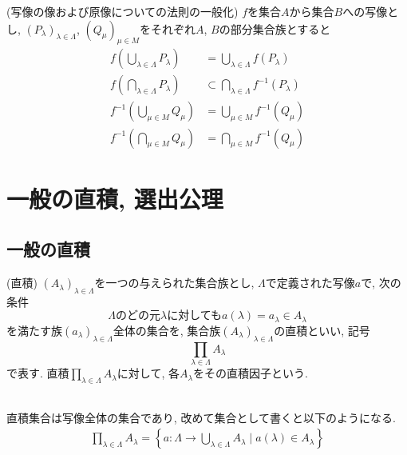 \documentclass[a4j]{jsarticle}
\begin{document}
\begin{itembox}[l]{ (写像の像および原像についての法則の一般化)}
  $f$を集合$A$から集合$B$への写像とし, $(P_\lambda)_{\lambda \in \Lambda}$, $(Q_\mu)_{\mu \in M}$をそれぞれ$A$, $B$の部分集合族とすると
  \begin{align}
    f \left( \bigcup_{\lambda \in \Lambda}P_\lambda \right) & = \bigcup_{\lambda \in \Lambda}f(P_\lambda)            \\
    f \left( \bigcap_{\lambda \in \Lambda}P_\lambda \right) & \subset \bigcap_{\lambda \in \Lambda}f^{-1}(P_\lambda) \\
    f^{-1} \left( \bigcup_{\mu \in M}Q_\mu \right)          & = \bigcup_{\mu \in M}f^{-1}(Q_\mu)                     \\
    f^{-1} \left( \bigcap_{\mu \in M}Q_\mu \right)          & = \bigcap_{\mu \in M}f^{-1}(Q_\mu)
  \end{align}
\end{itembox}

\section{一般の直積, 選出公理}

\subsection{一般の直積}

\begin{itembox}[l]{ (直積)}
  $(A_\lambda)_{\lambda \in \Lambda}$を一つの与えられた集合族とし, $\Lambda$で定義された写像$a$で, 次の条件$$ \Lambda\mbox{のどの元}\lambda\mbox{に対しても}a(\lambda)=a_\lambda \in A_\lambda $$を満たす族$(a_\lambda)_{\lambda \in \Lambda}$全体の集合を, 集合族$(A_\lambda)_{\lambda \in \Lambda}$の直積といい, 記号$$\prod_{\lambda \in \Lambda}A_\lambda$$で表す. 直積$\prod_{\lambda \in \Lambda}A_\lambda$に対して, 各$A_\lambda$をその直積因子という.
\end{itembox}\\

 直積集合は写像全体の集合であり, 改めて集合として書くと以下のようになる.
\begin{align}
  \prod_{\lambda \in \Lambda}A_\lambda = \left\{ a: \Lambda \rightarrow \bigcup_{\lambda \in \Lambda}A_\lambda \mid a(\lambda) \in A_\lambda \right\}
\end{align}
\end{document}
